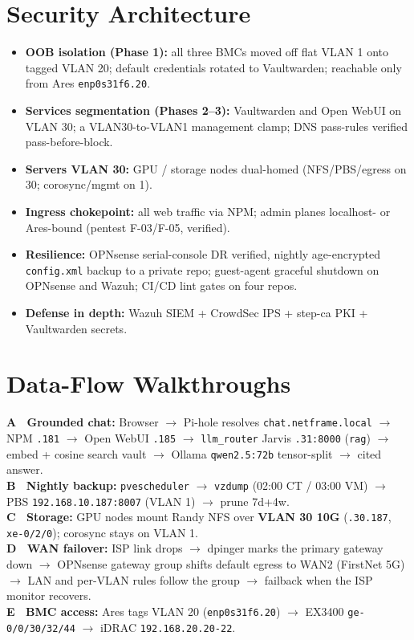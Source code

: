 \documentclass[11pt,letterpaper]{article}
\newcommand{\ip}[1]{\texttt{#1}}
\begin{document}
\section{Security Architecture}
\begin{itemize}[leftmargin=1.2em,itemsep=1pt]
  \item \textbf{OOB isolation (Phase 1):} all three BMCs moved off flat VLAN 1 onto tagged VLAN 20; default credentials rotated to Vaultwarden; reachable only from Ares \texttt{enp0s31f6.20}.
  \item \textbf{Services segmentation (Phases 2--3):} Vaultwarden and Open WebUI on VLAN 30; a VLAN30-to-VLAN1 management clamp; DNS pass-rules verified pass-before-block.
  \item \textbf{Servers VLAN 30:} GPU / storage nodes dual-homed (NFS/PBS/egress on 30; corosync/mgmt on 1).
  \item \textbf{Ingress chokepoint:} all web traffic via NPM; admin planes localhost- or Ares-bound (pentest F-03/F-05, verified).
  \item \textbf{Resilience:} OPNsense serial-console DR verified, nightly age-encrypted \texttt{config.xml} backup to a private repo; guest-agent graceful shutdown on OPNsense and Wazuh; CI/CD lint gates on four repos.
  \item \textbf{Defense in depth:} Wazuh SIEM + CrowdSec IPS + step-ca PKI + Vaultwarden secrets.
\end{itemize}

\section{Data-Flow Walkthroughs}
\textbf{A \textperiodcentered\ Grounded chat:} Browser $\to$ Pi-hole resolves \texttt{chat.netframe.local} $\to$ NPM \ip{.181} $\to$ Open WebUI \ip{.185} $\to$ \texttt{llm\_router} Jarvis \ip{.31:8000} (\texttt{rag}) $\to$ embed + cosine search vault $\to$ Ollama \texttt{qwen2.5:72b} tensor-split $\to$ cited answer.\\[2pt]
\textbf{B \textperiodcentered\ Nightly backup:} \texttt{pvescheduler} $\to$ \texttt{vzdump} (02:00 CT / 03:00 VM) $\to$ PBS \ip{192.168.10.187:8007} (VLAN 1) $\to$ prune 7d+4w.\\[2pt]
\textbf{C \textperiodcentered\ Storage:} GPU nodes mount Randy NFS over \textbf{VLAN 30 10G} (\ip{.30.187}, \texttt{xe-0/2/0}); corosync stays on VLAN 1.\\[2pt]
\textbf{D \textperiodcentered\ WAN failover:} ISP link drops $\to$ dpinger marks the primary gateway down $\to$ OPNsense gateway group shifts default egress to WAN2 (FirstNet 5G) $\to$ LAN and per-VLAN rules follow the group $\to$ failback when the ISP monitor recovers.\\[2pt]
\textbf{E \textperiodcentered\ BMC access:} Ares tags VLAN 20 (\texttt{enp0s31f6.20}) $\to$ EX3400 \texttt{ge-0/0/30/32/44} $\to$ iDRAC \ip{192.168.20.20-22}.
\end{document}
